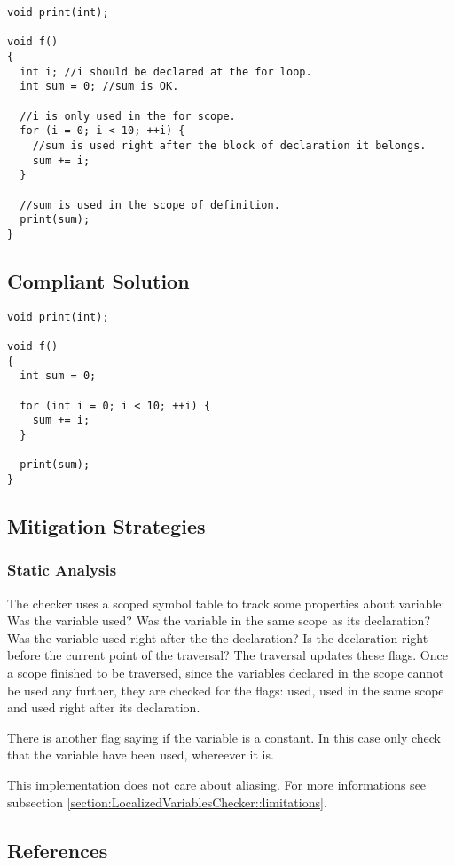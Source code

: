 \begin{verbatim}
void print(int);

void f()
{
  int i; //i should be declared at the for loop.
  int sum = 0; //sum is OK.

  //i is only used in the for scope.
  for (i = 0; i < 10; ++i) {
    //sum is used right after the block of declaration it belongs.
    sum += i;
  }

  //sum is used in the scope of definition.
  print(sum);
}
\end{verbatim}

\subsection{Compliant Solution}

\begin{verbatim}
void print(int);

void f()
{
  int sum = 0;

  for (int i = 0; i < 10; ++i) {
    sum += i;
  }

  print(sum);
}
\end{verbatim}

\subsection{Mitigation Strategies}
\subsubsection{Static Analysis}

The checker uses a scoped symbol table to track some properties about
variable: Was the variable used? Was the variable in the same scope as
its declaration? Was the variable used right after the the
declaration? Is the declaration right before the current point of the
traversal? The traversal updates these flags. Once a scope finished to
be traversed, since the variables declared in the scope cannot be used
any further, they are checked for the flags: used, used in the same scope
and used right after its declaration.

There is another flag saying if the variable is a constant. In this
case only check that the variable have been used, whereever it is.

This implementation does not care about aliasing. For more
informations see subsection
\ref{section:LocalizedVariablesChecker::limitations}.

\subsection{References}

